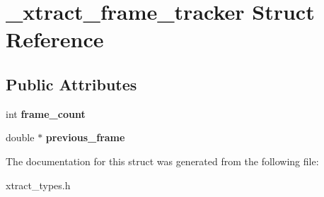 \hypertarget{struct__xtract__frame__tracker}{\section{\-\_\-xtract\-\_\-frame\-\_\-tracker Struct Reference}
\label{struct__xtract__frame__tracker}
}
\subsection*{Public Attributes}
\begin{DoxyCompactItemize}
\item 
\hypertarget{struct__xtract__frame__tracker_a3908789f8b62b95fef536cb029ce3e2c}{int {\bfseries frame\-\_\-count}}\label{struct__xtract__frame__tracker_a3908789f8b62b95fef536cb029ce3e2c}

\item 
\hypertarget{struct__xtract__frame__tracker_aa749204a74ad5c13a5e564d57e9f379e}{double $\ast$ {\bfseries previous\-\_\-frame}}\label{struct__xtract__frame__tracker_aa749204a74ad5c13a5e564d57e9f379e}

\end{DoxyCompactItemize}


The documentation for this struct was generated from the following file\-:\begin{DoxyCompactItemize}
\item 
xtract\-\_\-types.\-h\end{DoxyCompactItemize}
